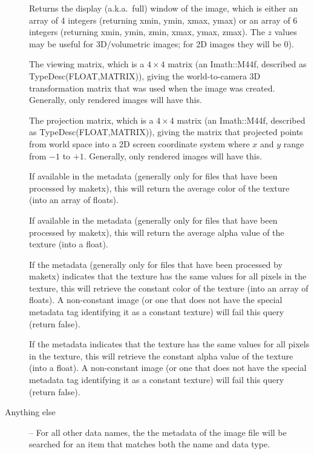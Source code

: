 \begin{description}
\item[\rm {}] 
Returns the display (a.k.a.\ full) window of the image, which is either an
array of 4 integers (returning xmin, ymin, xmax, ymax) or an array of 6
integers (returning xmin, ymin, zmin, xmax, ymax, zmax). The $z$ values may
be useful for 3D/volumetric images; for 2D images they will be 0).

\item[\rm {}] The viewing matrix, which is a $4 \times 4$
matrix (an {\cf Imath::M44f}, described as {\cf TypeDesc(FLOAT,MATRIX)}),
giving the world-to-camera 3D transformation matrix that was used when  the
image was created. Generally, only rendered images will have this.

\item[\rm {}] The projection matrix, which is a $4 \times 4$
matrix (an {\cf Imath::M44f}, described as {\cf TypeDesc(FLOAT,MATRIX)}),
giving the matrix that projected points from world space into a 2D screen
coordinate system where $x$ and $y$ range from $-1$ to $+1$.  Generally,
only rendered images will have this.

\item[\rm {}] If available in the metadata (generally only
for files that have been processed by {\cf maketx}), this will return the
average color of the texture (into an array of floats).  \NEW

\item[\rm {}] If available in the metadata (generally only
for files that have been processed by {\cf maketx}), this will return the
average alpha value of the texture (into a float).

\item[\rm {}] If the metadata (generally only for files that
have been processed by {\cf maketx}) indicates that the texture has the same
values for all pixels in the texture, this will retrieve the constant color
of the texture (into an array of floats). A non-constant image (or one that
does not have the special metadata tag identifying it as a constant texture)
will fail this query (return false). \NEW

\item[\rm {}] If the metadata indicates that the texture has
the same values for all pixels in the texture, this will retrieve the
constant alpha value of the texture (into a float). A non-constant image (or
one that does not have the special metadata tag identifying it as a constant
texture) will fail this query (return false).

\item[Anything else] -- For all other data names, the
the metadata of the image file will be searched for an item that
matches both the name and data type.

\end{description}
\apiend

